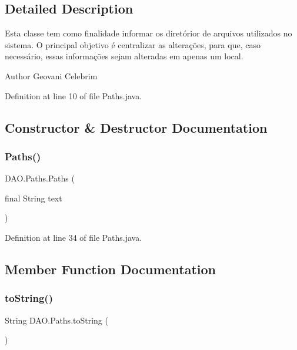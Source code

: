 \subsection{Detailed Description}
Esta classe tem como finalidade informar os diretórior de arquivos utilizados no sistema. O principal objetivo é centralizar as alterações, para que, caso necessário, essas informações sejam alteradas em apenas um local.

\begin{DoxyAuthor}{Author}
Geovani Celebrim 
\end{DoxyAuthor}


Definition at line 10 of file Paths.\+java.



\subsection{Constructor \& Destructor Documentation}
\hypertarget{enumDAO_1_1Paths_a7986fd29f6dec9c0c8d6d28574b81b1c}{}\label{enumDAO_1_1Paths_a7986fd29f6dec9c0c8d6d28574b81b1c} 
\subsubsection{\texorpdfstring{Paths()}{Paths()}}
{\footnotesize\ttfamily D\+A\+O.\+Paths.\+Paths (\begin{DoxyParamCaption}\item[{final String}]{text }\end{DoxyParamCaption})\hspace{0.3cm}{\ttfamily [private]}}



Definition at line 34 of file Paths.\+java.



\subsection{Member Function Documentation}
\hypertarget{enumDAO_1_1Paths_aec97ee6149db33c8d1880cf43ff3a77b}{}\label{enumDAO_1_1Paths_aec97ee6149db33c8d1880cf43ff3a77b} 
\subsubsection{\texorpdfstring{to\+String()}{toString()}}
{\footnotesize\ttfamily String D\+A\+O.\+Paths.\+to\+String (\begin{DoxyParamCaption}{ }\end{DoxyParamCaption})}

